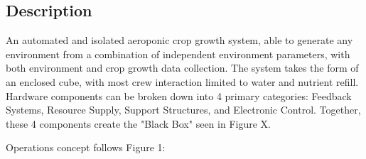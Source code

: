 \documentclass{report}
\begin{document}
\subsection{Description}
An automated and isolated aeroponic crop growth system, able to generate any environment from a combination of independent environment parameters, with both environment and crop growth data collection. The system takes the form of an enclosed cube, with most crew interaction limited to water and nutrient refill. Hardware components can be broken down into 4 primary categories: Feedback Systems, Resource Supply, Support Structures, and Electronic Control. Together, these 4 components create the "Black Box" seen in Figure X.




Operations concept follows Figure 1:



\end{document}
